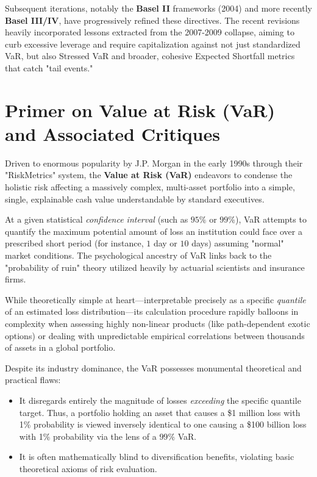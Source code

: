 Subsequent iterations, notably the \textbf{Basel II} frameworks (2004) and more recently \textbf{Basel III/IV}, have progressively refined these directives. The recent revisions heavily incorporated lessons extracted from the 2007-2009 collapse, aiming to curb excessive leverage and require capitalization against not just standardized VaR, but also Stressed VaR and broader, cohesive Expected Shortfall metrics that catch "tail events."

\section{Primer on Value at Risk (VaR) and Associated Critiques}

Driven to enormous popularity by J.P. Morgan in the early 1990s through their "RiskMetrics" system, the \textbf{Value at Risk (VaR)} endeavors to condense the holistic risk affecting a massively complex, multi-asset portfolio into a simple, single, explainable cash value understandable by standard executives.

At a given statistical \textit{confidence interval} (such as $95\%$ or $99\%$), VaR attempts to quantify the maximum potential amount of loss an institution could face over a prescribed short period (for instance, $1$ day or $10$ days) assuming "normal" market conditions. The psychological ancestry of VaR links back to the "probability of ruin" theory utilized heavily by actuarial scientists and insurance firms.

While theoretically simple at heart—interpretable precisely as a specific \textit{quantile} of an estimated loss distribution—its calculation procedure rapidly balloons in complexity when assessing highly non-linear products (like path-dependent exotic options) or dealing with unpredictable empirical correlations between thousands of assets in a global portfolio.

Despite its industry dominance, the VaR possesses monumental theoretical and practical flaws:
\begin{itemize}
    \item It disregards entirely the magnitude of losses \textit{exceeding} the specific quantile target. Thus, a portfolio holding an asset that causes a \$1 million loss with 1\% probability is viewed inversely identical to one causing a \$100 billion loss with 1\% probability via the lens of a $99\%$ VaR.
    \item It is often mathematically blind to diversification benefits, violating basic theoretical axioms of risk evaluation.
\end{itemize}

